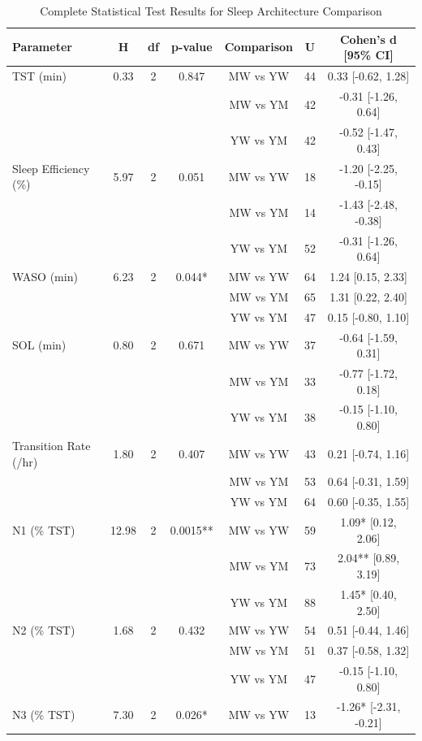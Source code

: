 \documentclass[ASNA,twocolumn]{USG}
\begin{document}
\begin{table}[!ht]
\centering
\caption{Complete Statistical Test Results for Sleep Architecture Comparison}
\begin{tabular*}{\textwidth}{@{\extracolsep\fill}lcccccc@{\extracolsep\fill}}
\toprule
\textbf{Parameter} & \textbf{H} & \textbf{df} & \textbf{p-value} & \textbf{Comparison} & \textbf{U} & \textbf{Cohen's d [95\% CI]} \\
\midrule
TST (min) & 0.33 & 2 & 0.847 & MW vs YW & 44 & 0.33 [-0.62, 1.28] \\
 & & & & MW vs YM & 42 & -0.31 [-1.26, 0.64] \\
 & & & & YW vs YM & 42 & -0.52 [-1.47, 0.43] \\
\midrule
Sleep Efficiency (\%) & 5.97 & 2 & 0.051 & MW vs YW & 18 & -1.20 [-2.25, -0.15] \\
 & & & & MW vs YM & 14 & -1.43 [-2.48, -0.38] \\
 & & & & YW vs YM & 52 & -0.31 [-1.26, 0.64] \\
\midrule
WASO (min) & 6.23 & 2 & 0.044* & MW vs YW & 64 & 1.24 [0.15, 2.33] \\
 & & & & MW vs YM & 65 & 1.31 [0.22, 2.40] \\
 & & & & YW vs YM & 47 & 0.15 [-0.80, 1.10] \\
\midrule
SOL (min) & 0.80 & 2 & 0.671 & MW vs YW & 37 & -0.64 [-1.59, 0.31] \\
 & & & & MW vs YM & 33 & -0.77 [-1.72, 0.18] \\
 & & & & YW vs YM & 38 & -0.15 [-1.10, 0.80] \\
\midrule
Transition Rate (/hr) & 1.80 & 2 & 0.407 & MW vs YW & 43 & 0.21 [-0.74, 1.16] \\
 & & & & MW vs YM & 53 & 0.64 [-0.31, 1.59] \\
 & & & & YW vs YM & 64 & 0.60 [-0.35, 1.55] \\
\midrule
N1 (\% TST) & 12.98 & 2 & 0.0015** & MW vs YW & 59 & 1.09* [0.12, 2.06] \\
 & & & & MW vs YM & 73 & 2.04** [0.89, 3.19] \\
 & & & & YW vs YM & 88 & 1.45* [0.40, 2.50] \\
\midrule
N2 (\% TST) & 1.68 & 2 & 0.432 & MW vs YW & 54 & 0.51 [-0.44, 1.46] \\
 & & & & MW vs YM & 51 & 0.37 [-0.58, 1.32] \\
 & & & & YW vs YM & 47 & -0.15 [-1.10, 0.80] \\
\midrule
N3 (\% TST) & 7.30 & 2 & 0.026* & MW vs YW & 13 & -1.26* [-2.31, -0.21] \\

\end{tabular*}
\end{table}
\end{document}
